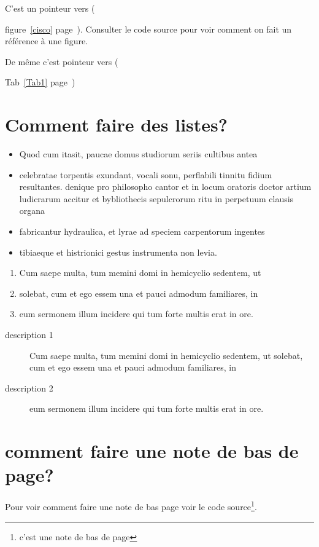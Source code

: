 \documentclass[a4paper,12 pt,twoside]{report}
\begin{document}
C'est un pointeur vers ({figure~\ref{cisco} page~\pageref{cisco}).
Consulter le code source pour voir comment on fait un référence à une figure.

De même c'est pointeur vers ({Tab~\ref{Tab1} page~\pageref{Tab1})

\section{Comment faire des listes?}

\begin{itemize}
    \item Quod cum itasit, paucae domus studiorum seriis cultibus antea
    \item {celebratae  torpentis exundant, vocali sonu, perflabili tinnitu fidium resultantes. denique pro philosopho cantor et in locum oratoris
    doctor artium ludicrarum accitur et bybliothecis sepulcrorum ritu in perpetuum clausis organa}
    \item fabricantur hydraulica, et lyrae ad speciem carpentorum ingentes
    \item tibiaeque et histrionici gestus instrumenta non levia.
\end{itemize}

\begin{enumerate}
    \item Cum saepe multa, tum memini domi in hemicyclio sedentem, ut
    \item solebat, cum et ego essem una et pauci admodum familiares, in
    \item eum sermonem illum incidere qui tum forte multis erat in ore.
\end{enumerate}

\begin{description}
    \item[description 1] Cum saepe multa, tum memini domi in hemicyclio sedentem, ut solebat, cum et ego essem una et pauci admodum familiares, in
    \item[description 2] eum sermonem illum incidere qui tum forte multis erat in ore.
\end{description}


\section{comment faire une note de bas de page?}
Pour voir comment faire une note de bas page voir le code
source\footnote{c'est une note de bas de page}.

}}
\end{document}

